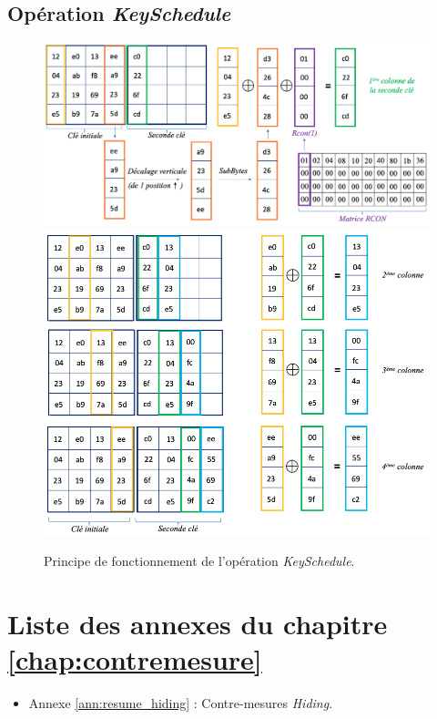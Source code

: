 \documentclass[oneside]{book}
\begin{document}
\begin{appendices}
\newpage

\section{Opération \textit{KeySchedule}}
\label{ann:KeySchedule}
\begin{figure}[htbp]
    \centering
    \includegraphics[scale=0.35]{image/KeySchedule1}
    \includegraphics[scale=0.45]{image/KeySchedule2}
    \caption{Principe de fonctionnement de l'opération \textit{KeySchedule}.}
    \label{fig:KeySchedule1}
\end{figure}

\newpage



\chapter{Liste des annexes du chapitre \ref{chap:contremesure}}
\begin{itemize}
\item Annexe \ref{ann:resume_hiding} : Contre-mesures \textit{Hiding}.
\end{itemize}


\end{appendices}
\end{document}
